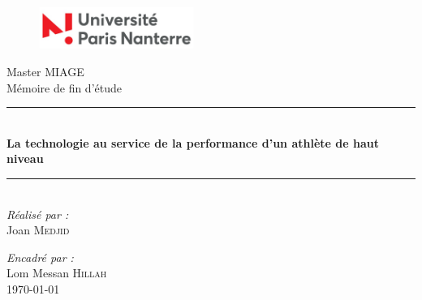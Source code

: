 \documentclass[oneside,12pt]{memoir}
\def\title{La technologie au service de la performance d'un athlète de haut niveau} %
\def\Date{\today}
\begin{document}
    \begin{titlingpage}

        \begin{center}
        
            \begin{figure}
              \includegraphics[width=0.45\textwidth]{logo-nanterre}\\[2cm]
            \end{figure}
            
            
            {\LARGE Master MIAGE}\\[0.5cm]
            {\LARGE Mémoire de fin d'étude}\\[1.5cm]
            
            \rule{\linewidth}{0.5mm} \\[0.4cm]
            { \huge \bfseries \title \\[0.4cm] }
            \rule{\linewidth}{0.5mm} \\[2cm]
            
    
            \large{\emph{Réalisé par :}}\\
            Joan \textsc{Medjid}
            
            \vspace{1 cm}
        
            \emph{Encadré par :}\\
            Lom Messan \textsc{Hillah} \\[2cm]
        
        
            
             \Large{{\Date}}
        
        \end{center}
    \end{titlingpage}
    
    
    \cleardoublepage
    
    
    \frontmatter
    \tableofcontents*
    

    
    \mainmatter
    
    
    
    
    
    

    
    \appendix
   
    
    \backmatter
    
    \nocite{*}
    \listoffigures
    
    
  
\end{document}
